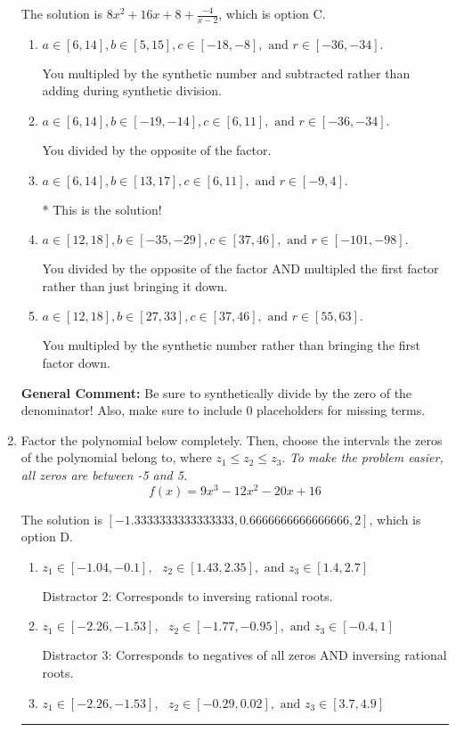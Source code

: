 \documentclass{extbook}[14pt]
\newcommand{\litem}[1]{\item #1

\rule{\textwidth}{0.4pt}}
\begin{document}
\begin{enumerate}
{The solution is \( 8x^{2} +16 x + 8 + \frac{-4}{x -2} \), which is option C.\begin{enumerate}[label=\Alph*.]
\item \( a \in [6, 14], b \in [5, 15], c \in [-18, -8], \text{ and } r \in [-36, -34]. \)

 You multipled by the synthetic number and subtracted rather than adding during synthetic division.
\item \( a \in [6, 14], b \in [-19, -14], c \in [6, 11], \text{ and } r \in [-36, -34]. \)

 You divided by the opposite of the factor.
\item \( a \in [6, 14], b \in [13, 17], c \in [6, 11], \text{ and } r \in [-9, 4]. \)

* This is the solution!
\item \( a \in [12, 18], b \in [-35, -29], c \in [37, 46], \text{ and } r \in [-101, -98]. \)

 You divided by the opposite of the factor AND multipled the first factor rather than just bringing it down.
\item \( a \in [12, 18], b \in [27, 33], c \in [37, 46], \text{ and } r \in [55, 63]. \)

 You multipled by the synthetic number rather than bringing the first factor down.
\end{enumerate}

\textbf{General Comment:} Be sure to synthetically divide by the zero of the denominator! Also, make sure to include 0 placeholders for missing terms.
}
\litem{
Factor the polynomial below completely. Then, choose the intervals the zeros of the polynomial belong to, where $z_1 \leq z_2 \leq z_3$. \textit{To make the problem easier, all zeros are between -5 and 5.}
\[ f(x) = 9x^{3} -12 x^{2} -20 x + 16 \]

The solution is \( [-1.3333333333333333, 0.6666666666666666, 2] \), which is option D.\begin{enumerate}[label=\Alph*.]
\item \( z_1 \in [-1.04, -0.1], \text{   }  z_2 \in [1.43, 2.35], \text{   and   } z_3 \in [1.4, 2.7] \)

 Distractor 2: Corresponds to inversing rational roots.
\item \( z_1 \in [-2.26, -1.53], \text{   }  z_2 \in [-1.77, -0.95], \text{   and   } z_3 \in [-0.4, 1] \)

 Distractor 3: Corresponds to negatives of all zeros AND inversing rational roots.
\item \( z_1 \in [-2.26, -1.53], \text{   }  z_2 \in [-0.29, 0.02], \text{   and   } z_3 \in [3.7, 4.9] \)


\end{enumerate}}
\end{enumerate}
\end{document}
